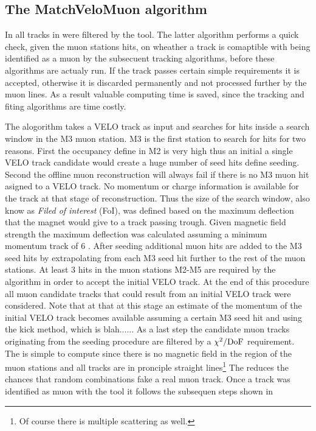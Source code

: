 \subsection{The MatchVeloMuon algorithm}
\label{sec:muon_matching}

In \runone all \velo tracks in \hltone were filtered by the \mvm tool. The latter algorithm performs a quick check,
given the muon stations hits, on wheather a \velo track is comaptible with being identified as a muon by the subsecuent
tracking algorithms, before these algorithms are actualy run. If the \velo track passes certain simple requirements it
is accepted, otherwise it is discarded permanently and not processed further by the \hltone muon lines. As a result
valuable computing time is saved, since the \FwD tracking and fiting algorithms are time costly.

The \mvm alogorithm takes a VELO track as input and searches for hits inside a search window in the M3 muon station.
M3 is the first station to search for hits for two reasons.
First the occupancy{\color{red} define} in M2 is very high thus an initial a single VELO track candidate would create
a huge number of seed hits{\color{red} define seeding}. Second the offline muon reconstruction will always fail if
there is no M3 muon hit asigned to a VELO track.
No momentum or charge information is available for the \velo track at that stage of reconstruction. Thus the size of the search window,
also know as {\it Filed of interest} (FoI),
was defined based on the maximum deflection that the \lhcb magnet would give to a track passing trough.
Given \lhcb magnetic field strength the maximum deflection was calculated assuming
a minimum momentum track of 6 \gevc. After seeding additional muon hits are added to the M3 seed hits
by extrapolating from each M3 seed hit further to the rest of the muon stations.
At least 3 hits in the muon stations M2-M5 are required by the algorithm in order to accept the initial VELO track.
At the end of this procedure all muon candidate tracks that could result from an initial VELO track were considered.
Note that at that at this stage an estimate of the momentum of the initial VELO track becomes available assuming
a certain M3 seed hit and using the kick method\cite{CERN-THESIS-2015-102}, which is blah......
As a last step the candidate muon tracks originating from the seeding procedure are filtered by a $\chi^2/{\rm DoF}$
requirement. The \chisq is simple to compute since there is no magnetic field in the region of the muon stations
and all tracks are in pronciple straight lines\footnote{Of course there is multiple scattering as well.}
The \chisq reduces the chances that random combinations fake a real muon track.
Once a track was identified as muon with the \mvm tool it follows the subsequen steps shown in \figref{}

